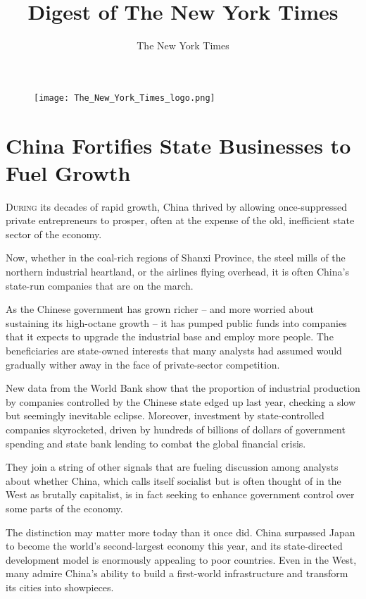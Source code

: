 ﻿\documentclass[12pt]{article}
\title{Digest of The New York Times}
\author{The New York Times}
\begin{document}
\date{}
\thispagestyle{empty}

\begin{figure}
\texttt{[image: The\_New\_York\_Times\_logo.png]}
\vspace{-20ex}
\end{figure}
\renewcommand\contentsname{}
{\footnotesize\textsf{\tableofcontents}}

\clearpage
\setcounter{page}{1}


\pagebreak
\section{China Fortifies State Businesses to Fuel Growth}

\lettrine{D}{uring} its decades of rapid growth, China thrived by allowing
once-suppressed private entrepreneurs to prosper, often at the expense of the old, inefficient state
sector of the economy.

Now, whether in the coal-rich regions of Shanxi Province, the steel mills of the northern industrial
heartland, or the airlines flying overhead, it is often China's state-run companies that are on the
march.

As the Chinese government has grown richer -- and more worried about sustaining its high-octane
growth -- it has pumped public funds into companies that it expects to upgrade the industrial base
and employ more people. The beneficiaries are state-owned interests that many analysts had assumed
would gradually wither away in the face of private-sector competition.

New data from the World Bank show that the proportion of industrial production by companies
controlled by the Chinese state edged up last year, checking a slow but seemingly inevitable
eclipse. Moreover, investment by state-controlled companies skyrocketed, driven by hundreds of
billions of dollars of government spending and state bank lending to combat the global financial
crisis.

They join a string of other signals that are fueling discussion among analysts about whether China,
which calls itself socialist but is often thought of in the West as brutally capitalist, is in fact
seeking to enhance government control over some parts of the economy.

The distinction may matter more today than it once did. China surpassed Japan to become the world's
second-largest economy this year, and its state-directed development model is enormously appealing
to poor countries. Even in the West, many admire China's ability to build a first-world
infrastructure and transform its cities into showpieces.
\end{document}
